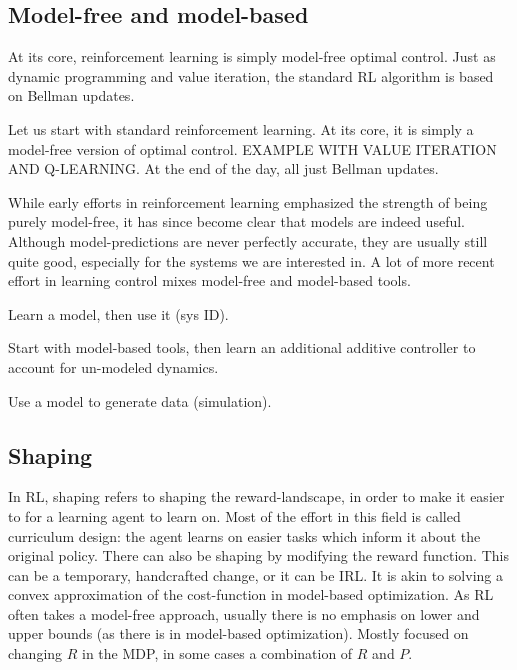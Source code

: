 \subsection{Model-free and model-based}
At its core, reinforcement learning is simply model-free optimal control. Just as dynamic programming and value iteration, the standard RL algorithm is based on Bellman updates. 

Let us start with standard reinforcement learning. At its core, it is simply a model-free version of optimal control. EXAMPLE WITH VALUE ITERATION AND Q-LEARNING.
At the end of the day, all just Bellman updates. \par

While early efforts in reinforcement learning emphasized the strength of being purely model-free, it has since become clear that models are indeed useful. Although model-predictions are never perfectly accurate, they are usually still quite good, especially for the systems we are interested in. A lot of more recent effort in learning control mixes model-free and model-based tools. \par

Learn a model, then use it (sys ID).

Start with model-based tools, then learn an additional additive controller to account for un-modeled dynamics.

Use a model to generate data (simulation).

\subsection{Shaping}

In RL, shaping refers to shaping the reward-landscape, in order to make it easier to for a learning agent to learn on.
Most of the effort in this field is called curriculum design: the agent learns on easier tasks which inform it about the original policy.
There can also be shaping by modifying the reward function. This can be a temporary, handcrafted change, or it can be IRL.
It is akin to solving a convex approximation of the cost-function in model-based optimization. As RL often takes a model-free approach, usually there is no emphasis on lower and upper bounds (as there is in model-based optimization).
Mostly focused on changing $R$ in the MDP, in some cases a combination of $R$ and $P$.


